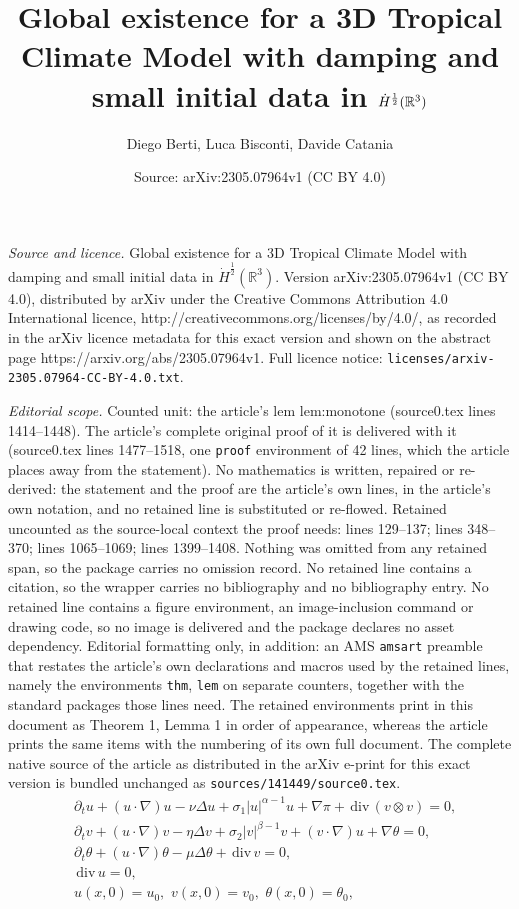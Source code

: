 \documentclass[10pt,a4paper]{amsart}
\title{Global existence for a 3D Tropical Climate Model with damping and small initial data in $\dot H^{\frac{1}{2}}(\R^3)$}
\author{Diego Berti, Luca Bisconti, Davide Catania}
\date{Source: arXiv:2305.07964v1 (CC BY 4.0)}
\newcommand{\D}{\partial}
\newcommand{\R}{\mathbb{R}}
\providecommand{\dv}{\,\mathrm{div}\,}
\begin{document}
\maketitle

\noindent\emph{Source and licence.} Global existence for a 3D Tropical Climate Model with damping and small initial data in $\dot H^{\frac{1}{2}}(\R^3)$. Version arXiv:2305.07964v1 (CC BY 4.0), distributed by arXiv under the Creative Commons Attribution 4.0 International licence, http://creativecommons.org/licenses/by/4.0/, as recorded in the arXiv licence metadata for this exact version and shown on the abstract page https://arxiv.org/abs/2305.07964v1. Full licence notice: \texttt{licenses/arxiv-2305.07964-CC-BY-4.0.txt}.\par\smallskip

\noindent\textit{Editorial scope.} Counted unit: the article's lem lem:monotone (source0.tex lines 1414--1448). The article's complete original proof of it is delivered with it (source0.tex lines 1477--1518, one \texttt{proof} environment of 42 lines, which the article places away from the statement). No mathematics is written, repaired or re-derived: the statement and the proof are the article's own lines, in the article's own notation, and no retained line is substituted or re-flowed.  Retained uncounted as the source-local context the proof needs: lines 129--137; lines 348--370; lines 1065--1069; lines 1399--1408.  Nothing was omitted from any retained span, so the package carries no omission record.  No retained line contains a citation, so the wrapper carries no bibliography and no bibliography entry.  No retained line contains a figure environment, an image-inclusion command or drawing code, so no image is delivered and the package declares no asset dependency.  Editorial formatting only, in addition: an AMS \texttt{amsart} preamble that restates the article's own declarations and macros used by the retained lines, namely the environments \texttt{thm}, \texttt{lem} on separate counters, together with the standard packages those lines need.  The retained environments print in this document as Theorem 1, Lemma 1 in order of appearance, whereas the article prints the same items with the numbering of its own full document.  The complete native source of the article as distributed in the arXiv e-print for this exact version is bundled unchanged as \texttt{sources/141449/source0.tex}.
\begin{equation}\label{TCM-gen}
  \begin{aligned}
    &\D_t u+ (u\cdot \nabla) u -\nu\Delta u + \sigma_1 |u|^{\alpha -1}u +\nabla \pi+\dv  (v \otimes v)=0,\\
    &\D_t v+ (u \cdot \nabla) v -\eta\Delta v + \sigma_2 |v|^{\beta -1}v + (v\cdot \nabla) u  +\nabla\theta =0,\\
    & \D_t \theta + (u \cdot \nabla) \theta  -\mu \Delta \theta  + \dv  v =0,\\
    &\dv  u = 0,\\
    & u (x, 0) =u_0,\,\, v (x, 0)=v_0,\,\, \theta (x, 0)=\theta_0,
  \end{aligned}
\end{equation}
\end{document}
